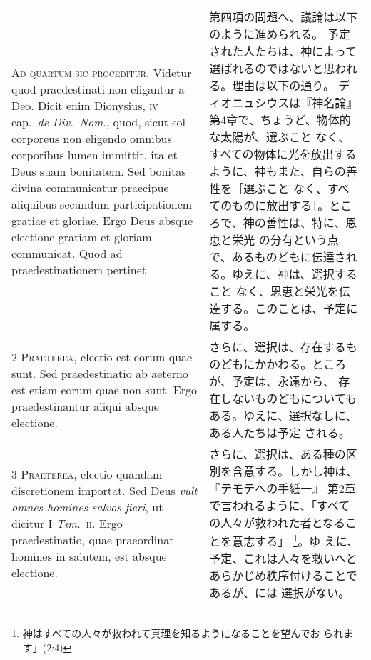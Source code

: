 \documentclass[10pt]{jsarticle} %
\begin{document}
\begin{longtable}{p{21em}p{21em}}

{\Huge A}{\scshape d quartum sic proceditur}. Videtur quod
 praedestinati non eligantur a Deo. Dicit enim Dionysius, {\scshape iv} cap.~{\itshape de Div.~Nom}., quod, sicut sol corporeus non eligendo omnibus corporibus
 lumen immittit, ita et Deus suam bonitatem. Sed bonitas divina
 communicatur praecipue aliquibus secundum participationem gratiae et
 gloriae. Ergo Deus absque electione gratiam et gloriam communicat. Quod
 ad praedestinationem pertinet.


&

第四項の問題へ、議論は以下のように進められる。
予定された人たちは、神によって選ばれるのではないと思われる。理由は以下の通り。
ディオニュシウスは『神名論』第4章で、ちょうど、物体的な太陽が、選ぶこと
 なく、すべての物体に光を放出するように、神もまた、自らの善性を［選ぶこと
 なく、すべてのものに放出する］。ところで、神の善性は、特に、恩恵と栄光
 の分有という点で、あるものどもに伝達される。ゆえに、神は、選択すること
 なく、恩恵と栄光を伝達する。このことは、予定に属する。


\\



{\scshape 2 Praeterea}, electio est eorum quae sunt. Sed
 praedestinatio ab aeterno est etiam eorum quae non sunt. Ergo
 praedestinantur aliqui absque electione.


&

さらに、選択は、存在するものどもにかかわる。ところが、予定は、永遠から、
 存在しないものどもについてもある。ゆえに、選択なしに、ある人たちは予定
 される。


\\



{\scshape 3 Praeterea}, electio quandam discretionem
 importat. Sed Deus {\itshape vult omnes homines salvos fieri}, ut dicitur I
 {\itshape Tim}.~{\scshape ii}. Ergo praedestinatio, quae praeordinat homines in salutem, est
 absque electione.


&

さらに、選択は、ある種の区別を含意する。しかし神は、『テモテへの手紙一』
 第2章
 で言われるように、「すべての人々が救われた者となることを意志する」
 \footnote{神はすべての人々が救われて真理を知るようになることを望んでお
 られます」(2:4)}。ゆ
 えに、予定、これは人々を救いへとあらかじめ秩序付けることであるが、には
 選択がない。

\\




\end{longtable}
\end{document}

